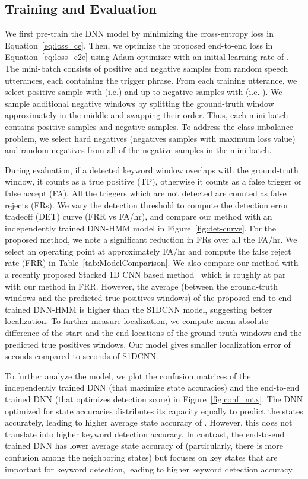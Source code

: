 \documentclass{article}
\begin{document}
\subsection{Training and Evaluation}
We first pre-train the DNN model by minimizing the cross-entropy loss in Equation~\eqref{eq:loss_ce}.
Then, we optimize the proposed end-to-end loss in Equation~\eqref{eq:loss_e2e} using Adam optimizer \cite{adam} with an initial learning rate of .
The mini-batch consists of positive and negative samples from  random speech utterances, each containing the trigger phrase.
From each training utterance, we select  positive sample with  (i.e.) and up to  negative samples with  (i.e. ).
We sample  additional negative windows by splitting the ground-truth window approximately in the middle and swapping their order.
Thus, each mini-batch contains  positive samples and  negative samples.
To address the class-imbalance problem, we select  hard negatives (negatives samples with maximum loss value) and  random negatives from all of the negative samples in the mini-batch.


During evaluation, if a detected keyword window overlaps with the ground-truth window, it counts as a true positive (TP), otherwise it counts as a false trigger or false accept (FA).
All the triggers which are not detected are counted as false rejects (FRs).
We vary the detection threshold to compute the detection error tradeoff (DET) curve (FRR vs FA/hr), and compare our method with an independently trained DNN-HMM model in Figure~\ref{fig:det-curve}.
For the proposed method, we note a significant reduction in FRs over all the FA/hr.
We select an operating point at approximately  FA/hr and compute the false reject rate (FRR) in Table~\ref{tab:ModelComparison}.
We also compare our method with a recently proposed Stacked 1D CNN based method~\cite{Higuchi2020} which is roughly at par with our method in FRR.
However, the average  (between the ground-truth windows and the predicted true positives windows) of the proposed end-to-end trained DNN-HMM is  higher than the S1DCNN model, suggesting better localization.
To further measure localization, we compute mean absolute difference of the start and the end locations of the ground-truth windows and the predicted true positives windows.
Our model gives smaller localization error of  seconds compared to  seconds of S1DCNN.

To further analyze the model, we plot the confusion matrices of the independently trained DNN (that maximize state accuracies) and the end-to-end trained DNN (that optimizes detection score) in Figure~\ref{fig:conf_mtx}.
The DNN optimized for state accuracies distributes its capacity equally to predict the states accurately, leading to higher average state accuracy of .
However, this does not translate into higher keyword detection accuracy.
In contrast, the end-to-end trained DNN has lower average state accuracy of  (particularly, there is more confusion among the neighboring states) but focuses on key states that are important for keyword detection, leading to higher keyword detection accuracy.
\end{document}
